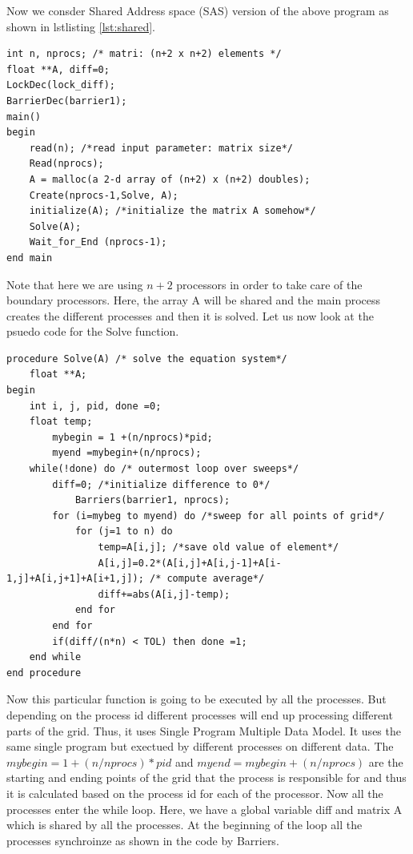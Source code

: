 \documentclass[12pt]{article}
\begin{document}
Now we consder Shared Address space (SAS) version of the above program as shown in lstlisting \ref{lst:shared}.
\begin{lstlisting}[caption={Shared Address Space Version},captionpos=b,label={lst:shared}]
int n, nprocs; /* matri: (n+2 x n+2) elements */
float **A, diff=0;
LockDec(lock_diff);
BarrierDec(barrier1);
main()
begin
    read(n); /*read input parameter: matrix size*/
    Read(nprocs);
    A = malloc(a 2-d array of (n+2) x (n+2) doubles);
    Create(nprocs-1,Solve, A);
    initialize(A); /*initialize the matrix A somehow*/
    Solve(A);
    Wait_for_End (nprocs-1);
end main
\end{lstlisting}
Note that here we are using $n+2$ processors in order to take care of the boundary processors.
Here, the array A will be shared and the main process creates the different processes and then it is solved.
Let us now look at the psuedo code for the Solve function.
\begin{lstlisting}[caption={Solve Function},captionpos=b,label={lst:solve}]
procedure Solve(A) /* solve the equation system*/
    float **A;
begin
    int i, j, pid, done =0;
    float temp;
        mybegin = 1 +(n/nprocs)*pid;
        myend =mybegin+(n/nprocs);
    while(!done) do /* outermost loop over sweeps*/
        diff=0; /*initialize difference to 0*/
            Barriers(barrier1, nprocs);
        for (i=mybeg to myend) do /*sweep for all points of grid*/
            for (j=1 to n) do
                temp=A[i,j]; /*save old value of element*/
                A[i,j]=0.2*(A[i,j]+A[i,j-1]+A[i-1,j]+A[i,j+1]+A[i+1,j]); /* compute average*/
                diff+=abs(A[i,j]-temp);
            end for
        end for
        if(diff/(n*n) < TOL) then done =1;
    end while
end procedure
\end{lstlisting}
Now this particular function is going to be executed by all the processes. But depending on the 
process id different processes will end up processing different parts of the grid. Thus, it uses Single Program Multiple Data Model.
It uses the same single program but exectued by different processes on different data.
The $mybegin=1+(n/nprocs)*pid$ and $myend=mybegin+(n/nprocs)$ are the starting and ending points of the grid that the process is responsible for and thus it is calculated based on the process id for each of the processor.
Now all the processes enter the while loop. Here, we have a global variable diff and matrix A which is shared by all the processes.
At the beginning of the loop all the processes synchroinze as shown in the code by Barriers.
\end{document}
